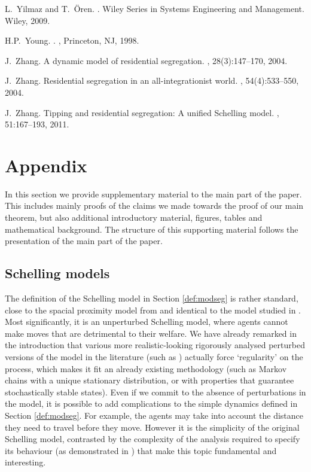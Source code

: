 \documentclass[11pt]{article}
\theoremstyle{plain}
\numberwithin{equation}{subsection}
\begin{document}
\begin{thebibliography}{CMGP13}
L.~Yilmaz and T.~{\"O}ren.
.
\newblock Wiley Series in Systems Engineering and Management. Wiley, 2009.

H.P.\ Young.
.
, Princeton, NJ, 1998.

J.\ Zhang.
\newblock A dynamic model of residential segregation.
, 28(3):147--170, 2004.

J.\ Zhang.
\newblock Residential segregation in an all-integrationist world.
, 54(4):533--550,
  2004.

J.\ Zhang.
\newblock Tipping and residential segregation: A unified {S}chelling model.
, 51:167--193, 2011.

\end{thebibliography}

\newpage


\section{Appendix}\label{se:prelim}
In this section we provide supplementary material to the main part of the paper. 
This includes mainly proofs of the claims we made towards the proof of our main theorem, but also
additional introductory material, figures, tables and mathematical background.
The structure of this supporting material follows the presentation of the main part of the paper.

\subsection{Schelling models}\label{ssub:varschel}
The definition of the Schelling model in Section \ref{def:modseg} is rather standard, close to
the spacial proximity model from  \cite{TS1, TS71a}  and identical to
the model studied in \cite{brandt:an, BELschel13}. 
Most significantly, it is an unperturbed Schelling model, where agents cannot
make moves that are detrimental to their welfare.
We have already remarked in the introduction
that various more realistic-looking rigorously analysed perturbed versions of the model 
in the literature (such as \cite{JZ1}) actually force `regularity' on the process, which
makes it fit an already existing methodology 
(such as Markov chains with a unique stationary distribution, 
or with properties that guarantee stochastically stable states).
Even if we commit to the absence of perturbations in the model, 
it is possible to add complications to the simple dynamics defined in
Section \ref{def:modseg}. For example, the agents
may take into account the distance they need to travel before they move.
However it is the simplicity of the original Schelling model,
contrasted by  the complexity of the analysis required to specify its behaviour
(as demonstrated in \cite{brandt:an, BELschel13}) 
that make this topic fundamental and interesting.
\end{document}
